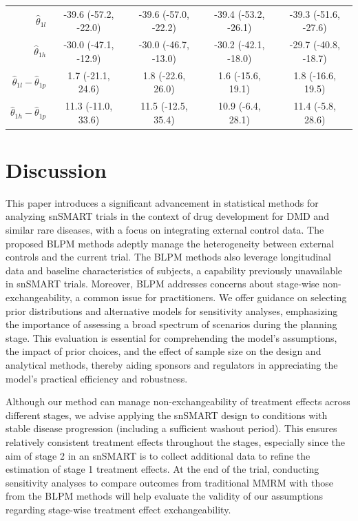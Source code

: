 \begin{table}
\begin{tabular}{ccccc}
\multicolumn{1}{r}{$\widehat{\theta}_{1l}$} &  -39.6 (-57.2, -22.0) &  -39.6 (-57.0, -22.2)  &  -39.4 (-53.2, -26.1) &  -39.3 (-51.6, -27.6) \tabularnewline

\multicolumn{1}{r}{$\widehat{\theta}_{1h}$} &  -30.0 (-47.1, -12.9) &  -30.0 (-46.7, -13.0)  &  -30.2 (-42.1, -18.0) &   -29.7 (-40.8, -18.7)\tabularnewline

\multicolumn{1}{r}{$\widehat{\theta}_{1l} - \widehat{\theta}_{1p}$} &  1.7 (-21.1, 24.6) &  1.8 (-22.6, 26.0)  &  1.6 (-15.6, 19.1) &  1.8 (-16.6, 19.5)   \tabularnewline
\multicolumn{1}{r}{$\widehat{\theta}_{1h} - \widehat{\theta}_{1p}$} &  11.3 (-11.0, 33.6) &  11.5 (-12.5, 35.4)  &  10.9 (-6.4, 28.1) &  11.4 (-5.8, 28.6) \tabularnewline
\hline
\end{tabular}
\end{table}

\section{Discussion}
\label{sec:discussion_longitudinal}
This paper introduces a significant advancement in statistical methods for analyzing \ac{snSMART} trials in the context of drug development for \ac{DMD} and similar rare diseases, with a focus on integrating external control data. The proposed \ac{BLPM} methods adeptly manage the heterogeneity between external controls and the current trial. The \ac{BLPM} methods also leverage longitudinal data and baseline characteristics of subjects, a capability previously unavailable in \ac{snSMART} trials. Moreover, \ac{BLPM} addresses concerns about stage-wise non-exchangeability, a common issue for practitioners. We offer guidance on selecting prior distributions and alternative models for sensitivity analyses, emphasizing the importance of assessing a broad spectrum of scenarios during the planning stage. This evaluation is essential for comprehending the model's assumptions, the impact of prior choices, and the effect of sample size on the design and analytical methods, thereby aiding sponsors and regulators in appreciating the model's practical efficiency and robustness.

Although our method can manage non-exchangeability of treatment effects across different stages, we advise applying the \ac{snSMART} design to conditions with stable disease progression (including a sufficient washout period). This ensures relatively consistent treatment effects throughout the stages, especially since the aim of stage 2 in an \ac{snSMART} is to collect additional data to refine the estimation of stage 1 treatment effects. At the end of the trial, conducting sensitivity analyses to compare outcomes from traditional \ac{MMRM} with those from the \ac{BLPM} methods will help evaluate the validity of our assumptions regarding stage-wise treatment effect exchangeability.

